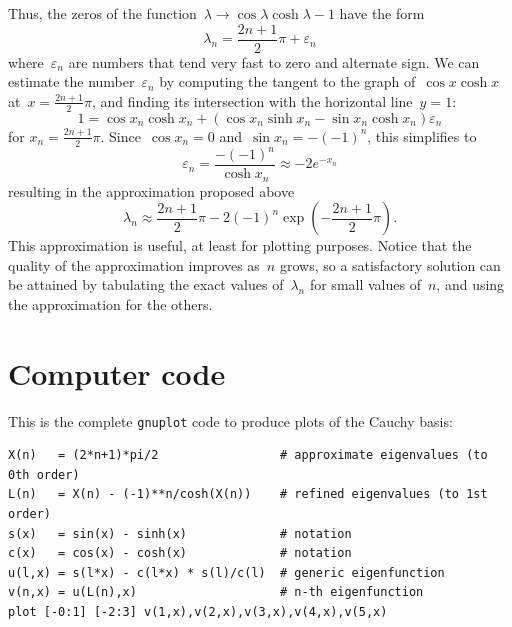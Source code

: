 Thus, the zeros of the function~$\lambda\to\cos\lambda\cosh\lambda-1$ have the
form
$$
\lambda_n = \frac{2n+1}{2}\pi + \varepsilon_n
$$
where~$\varepsilon_n$ are numbers that tend very fast to zero and alternate
sign.
We can estimate the number~$\varepsilon_n$ by computing the tangent to the
graph of~$\cos x\cosh x$ at~$x=\frac{2n+1}{2}\pi$, and finding its
intersection with the horizontal line~$y=1$:
$$
1 = \cos x_n\cosh x_n +
\left(
\cos x_n\sinh x_n - \sin x_n\cosh x_n
\right) \varepsilon_n
$$
for $x_n=\frac{2n+1}{2}\pi$.  Since~$\cos x_n=0$ and~$\sin x_n=-(-1)^n$, this
simplifies to
$$
\varepsilon_n=\frac{-(-1)^n}{\cosh x_n} \approx -2e^{-x_n}
$$
resulting in the approximation proposed above
$$
\lambda_n\approx\frac{2n+1}{2}\pi-2(-1)^n\exp\left(-\frac{2n+1}{2}\pi\right).
$$
This approximation is useful, at least for plotting purposes.
Notice that the quality of the approximation improves as~$n$ grows, so a
satisfactory solution can be attained by tabulating the exact values
of~$\lambda_n$ for small values of~$n$, and using the approximation for the
others.




\section{Computer code}
This is the complete \verb+gnuplot+ code to produce plots of the Cauchy
basis:

\begin{verbatim}
X(n)   = (2*n+1)*pi/2                 # approximate eigenvalues (to 0th order)
L(n)   = X(n) - (-1)**n/cosh(X(n))    # refined eigenvalues (to 1st order)
s(x)   = sin(x) - sinh(x)             # notation
c(x)   = cos(x) - cosh(x)             # notation
u(l,x) = s(l*x) - c(l*x) * s(l)/c(l)  # generic eigenfunction
v(n,x) = u(L(n),x)                    # n-th eigenfunction
plot [-0:1] [-2:3] v(1,x),v(2,x),v(3,x),v(4,x),v(5,x)
\end{verbatim}

